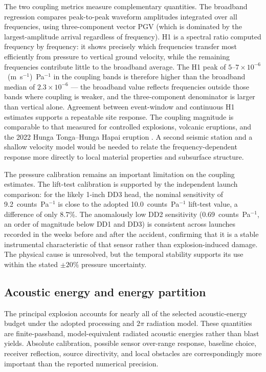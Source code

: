 \documentclass[]{seismica}
\begin{document}
The two coupling metrics measure complementary quantities. The broadband
regression compares peak-to-peak waveform amplitudes integrated over all
frequencies, using three-component vector PGV (which is dominated by the
largest-amplitude arrival regardless of frequency). H1 is a spectral ratio
computed frequency by frequency: it shows precisely which frequencies transfer
most efficiently from pressure to vertical ground velocity, while the
remaining frequencies contribute little to the broadband average. The H1
peak of $5$--$7\times10^{-6}$~(m~s$^{-1}$)~Pa$^{-1}$ in the coupling bands
is therefore higher than the broadband median of $2.3\times10^{-6}$ --- the
broadband value reflects frequencies outside those bands where coupling is
weaker, and the three-component denominator is larger than vertical alone.
Agreement between event-window and continuous H1 estimates supports a
repeatable site response. The coupling magnitude is comparable to that
measured for controlled explosions, volcanic eruptions, and the 2022 Hunga
Tonga--Hunga Ha\textquotesingle pai eruption \citep{novoselov_ground_coupling_2020,
anthony_hunga_coupling_2023,macpherson_hunga_coupling_2025}. A second seismic
station and a shallow velocity model would be needed to relate the
frequency-dependent response more directly to local material properties and
subsurface structure.

The pressure calibration remains an important limitation on the coupling
estimates. The lift-test calibration is supported by the independent launch
comparison: for the likely 1-inch DD3 head, the nominal sensitivity of
9.2~counts~Pa$^{-1}$ is close to the adopted 10.0~counts~Pa$^{-1}$ lift-test
value, a difference of only 8.7\%. The anomalously low DD2 sensitivity
(0.69~counts~Pa$^{-1}$, an order of magnitude below DD1 and DD3) is
consistent across launches recorded in the weeks before and after the
accident, confirming that it is a stable instrumental characteristic of that
sensor rather than explosion-induced damage. The physical cause is unresolved,
but the temporal stability supports its use within the stated $\pm20\%$
pressure uncertainty.

\subsection{Acoustic energy and energy partition}

The principal explosion accounts for nearly all of the selected
acoustic-energy budget under the adopted processing and $2\pi$ radiation
model. These quantities are finite-passband, model-equivalent radiated acoustic
energies rather than blast yields. Absolute calibration, possible sensor
over-range response, baseline choice, receiver reflection, source directivity,
and local obstacles are correspondingly more important than the reported
numerical precision.
\end{document}
